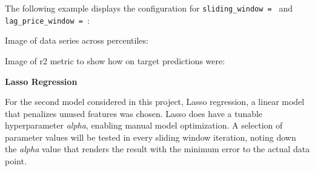 \documentclass[12pt]{report} %
\begin{document}

The following example displays the configuration for \verb|sliding_window = | and \verb|lag_price_window = |:

Image of data series across percentiles:

Image of r2 metric to show how on target predictions were:

\noindent \textbf{Lasso Regression}

For the second model considered in this project, Lasso regression, a linear model that penalizes unused features was chosen. Lasso does have a tunable hyperparameter \textit{alpha}, enabling manual model optimization. A selection of parameter values will be tested in every sliding window iteration, noting down the \textit{alpha} value that renders the result with the minimum error to the actual data point.






\end{document}
